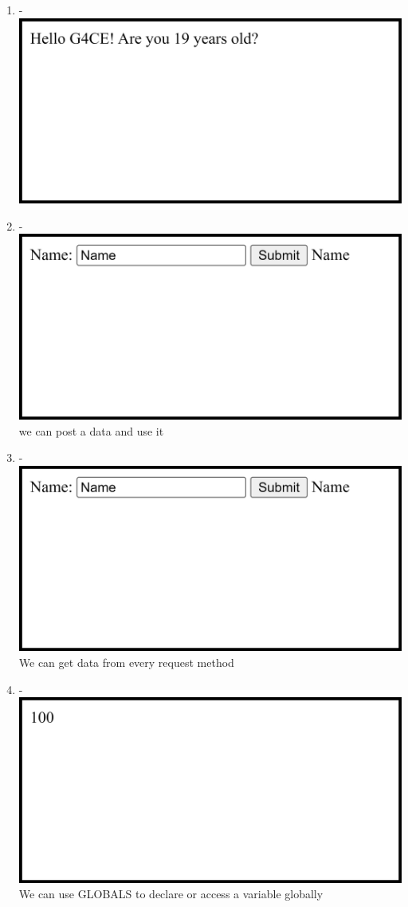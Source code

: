 \documentclass[12pt,titlepage]{article}
\begin{document}
\begin{enumerate}
    \newpage

    \item - \\ \includegraphics[width=.9\textwidth]{images/figures/fig23.png}
    \item - \\ \includegraphics[width=.9\textwidth]{images/figures/fig24.png} \\ we can post a data and use it
    
    \newpage

    \item - \\ \includegraphics[width=.9\textwidth]{images/figures/fig25.png} \\ We can get data from every request method
    \item - \\ \includegraphics[width=.9\textwidth]{images/figures/fig26.png} \\ We can use GLOBALS to declare or access a variable globally
\end{enumerate}
\end{document}
